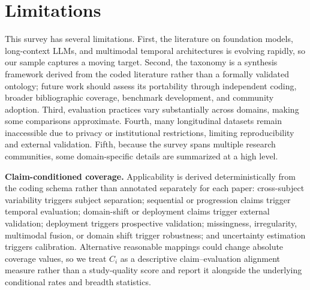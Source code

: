 \documentclass[11pt]{article}
\theoremstyle{plain}
\theoremstyle{definition}
\theoremstyle{remark}
\begin{document}
\section{Limitations}
\label{sec:limitations}
This survey has several limitations. First, the literature on foundation models, long-context LLMs, and multimodal temporal architectures is evolving rapidly, so our sample captures a moving target. Second, the taxonomy is a synthesis framework derived from the coded literature rather than a formally validated ontology; future work should assess its portability through independent coding, broader bibliographic coverage, benchmark development, and community adoption. Third, evaluation practices vary substantially across domains, making some comparisons approximate. Fourth, many longitudinal datasets remain inaccessible due to privacy or institutional restrictions, limiting reproducibility and external validation. Fifth, because the survey spans multiple research communities, some domain-specific details are summarized at a high level.

\textbf{Claim-conditioned coverage.} Applicability is derived deterministically from the coding schema rather than annotated separately for each paper: cross-subject variability triggers subject separation; sequential or progression claims trigger temporal evaluation; domain-shift or deployment claims trigger external validation; deployment triggers prospective validation; missingness, irregularity, multimodal fusion, or domain shift trigger robustness; and uncertainty estimation triggers calibration. Alternative reasonable mappings could change absolute coverage values, so we treat $C_i$ as a descriptive claim--evaluation alignment measure rather than a study-quality score and report it alongside the underlying conditional rates and breadth statistics.
\end{document}

